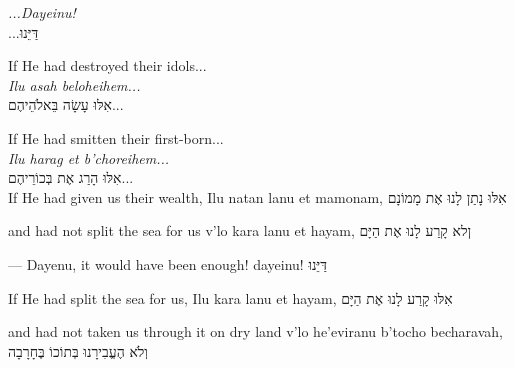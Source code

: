 {\begin{itemize}
{{		\textit{...Dayeinu!}\\
		\texthebrew{...דַּיֵּנוּ}\\}
		\vspace*{2ex}		
		\raggedright{If He had destroyed their idols...\\
		\textit{Ilu asah beloheihem...}\\
		\texthebrew{אִלּוּ עָשָׂה בֵּאלֹהֵיהֶם...}\\}
		\vspace*{2ex}
		\vspace*{2ex}
		\vspace*{2ex}
		\raggedright{If He had smitten their first-born...\\
		\textit{Ilu harag et b'choreihem...}\\
		\texthebrew{אִלּוּ הָרַג אֶת בְּכוֹרֵיהֶם...}\\}
		\vspace*{2ex}
		\vspace*{2ex}		
		\vspace*{2ex}
		If He had given us their wealth,
		Ilu natan lanu et mamonam,
		\texthebrew{אִלּוּ נָתַן לָנוּ אֶת מָמוֹנָם}
		
		and had not split the sea for us
		v'lo kara lanu et hayam,
		\texthebrew{ןלא קָרַע לָנוּ אֶת הַיָּם}

		— Dayenu, it would have been enough!
		dayeinu!
		\texthebrew{דַּיֵּנוּ}
		
		If He had split the sea for us,
		Ilu kara lanu et hayam,
		\texthebrew{אִלּוּ קָרַע לָנוּ אֶת הַיָּם}
		
		and had not taken us through it on dry land
		v'lo he'eviranu b'tocho becharavah,
		\texthebrew{וְלֹא הֶעֱבִירָנוּ בְּתוֹכוֹ בֶּחָרָבָה}

}
\end{itemize}}
